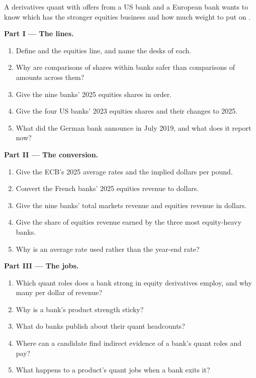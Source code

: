 \begin{problem}\label{pb:in:bank-markets-divisions:1}
A derivatives quant with offers from a US bank and a European bank wants to know which has the stronger equities
business and how much weight to put on .

\medskip\noindent\textbf{Part I --- The lines.}
\begin{enumerate}
\item Define  and the equities line, and name the desks of each.
\item Why are comparisons of shares within banks safer than comparisons of amounts across them?
\item Give the nine banks' 2025 equities shares in order.
\item Give the four US banks' 2023 equities shares and their changes to 2025.
\item What did the German bank announce in July 2019, and what does it report now?
\end{enumerate}

\medskip\noindent\textbf{Part II --- The conversion.}
\begin{enumerate}[resume]
\item Give the ECB's 2025 average rates and the implied dollars per pound.
\item Convert the French banks' 2025 equities revenue to dollars.
\item Give the nine banks' total markets revenue and equities revenue in dollars.
\item Give the share of equities revenue earned by the three most equity-heavy banks.
\item Why is an average rate used rather than the year-end rate?
\end{enumerate}

\medskip\noindent\textbf{Part III --- The jobs.}
\begin{enumerate}[resume]
\item Which quant roles does a bank strong in equity derivatives employ, and why many per dollar of revenue?
\item Why is a bank's product strength sticky?
\item What do banks publish about their quant headcounts?
\item Where can a candidate find indirect evidence of a bank's quant roles and pay?
\item What happens to a product's quant jobs when a bank exits it?
\end{enumerate}


\end{problem}
